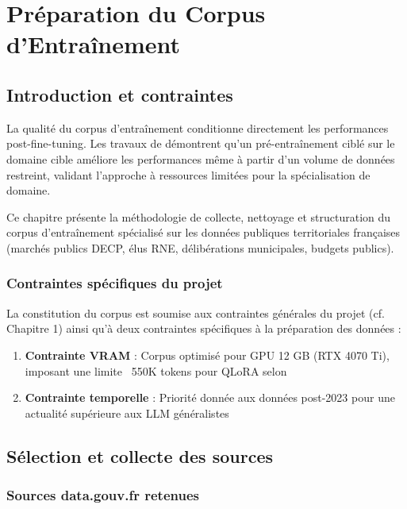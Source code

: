 
\chapter{Préparation du Corpus d'Entraînement}

\section{Introduction et contraintes}

La qualité du corpus d'entraînement conditionne directement les performances post-fine-tuning. Les travaux de \citet{gururangan2020dont} démontrent qu'un pré-entraînement ciblé sur le domaine cible améliore les performances même à partir d'un volume de données restreint, validant l'approche à ressources limitées pour la spécialisation de domaine.

Ce chapitre présente la méthodologie de collecte, nettoyage et structuration du corpus d'entraînement spécialisé sur les données publiques territoriales françaises (marchés publics DECP, élus RNE, délibérations municipales, budgets publics).

\subsection{Contraintes spécifiques du projet}

La constitution du corpus est soumise aux contraintes générales du projet (cf. Chapitre 1) ainsi qu'à deux contraintes spécifiques à la préparation des données :

\begin{enumerate}
    \item \textbf{Contrainte VRAM} : Corpus optimisé pour GPU 12 GB (RTX 4070 Ti), imposant une limite ~550K tokens pour QLoRA selon \citet{dettmers2023qlora}
    
    \item \textbf{Contrainte temporelle} : Priorité donnée aux données post-2023 pour une actualité supérieure aux LLM généralistes
\end{enumerate}

\section{Sélection et collecte des sources}

\subsection{Sources data.gouv.fr retenues}

